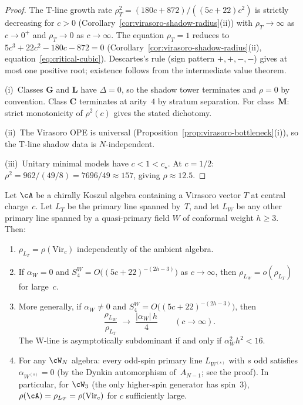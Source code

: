 \begin{proof}
The T-line growth rate $\rho_T^2 = (180c{+}872)/((5c{+}22)c^2)$
is strictly decreasing for $c > 0$
(Corollary~\ref{cor:virasoro-shadow-radius}(ii))
with $\rho_T \to \infty$ as $c \to 0^+$ and
$\rho_T \to 0$ as $c \to \infty$.
The equation $\rho_T = 1$ reduces to
$5c^3 + 22c^2 - 180c - 872 = 0$
(Corollary~\ref{cor:virasoro-shadow-radius}(ii),
equation~\eqref{eq:critical-cubic}).
Descartes's rule (sign pattern $+,+,-,-$) gives
at most one positive root; existence follows from the
intermediate value theorem.

(i)~Classes $\mathbf{G}$ and $\mathbf{L}$ have
$\Delta = 0$, so the shadow tower terminates and $\rho = 0$
by convention.  Class $\mathbf{C}$ terminates at arity~$4$
by stratum separation.  For class~$\mathbf{M}$:
strict monotonicity of $\rho^2(c)$ gives the stated
dichotomy.

(ii)~The Virasoro OPE is universal
(Proposition~\ref{prop:virasoro-bottleneck}(i)),
so the T-line shadow data is $N$-independent.

(iii)~Unitary minimal models have $c < 1 < c_\star$.
At $c = 1/2$: $\rho^2 = 962/(49/8)
= 7696/49 \approx 157$, giving
$\rho \approx 12.5$.
\end{proof}

\begin{proposition}
\label{prop:virasoro-bottleneck}
\ClaimStatusProvedHere
{}
Let $\cA$ be a chirally Koszul algebra containing a
Virasoro vector $T$ at central charge~$c$.
Let $L_T$ be the primary line spanned by~$T$, and
let $L_W$ be any other primary line spanned by a
quasi-primary field $W$ of conformal weight $h \geq 3$.
Then:
\begin{enumerate}[label=\textup{(\roman*)}]
\item $\rho_{L_T} = \rho(\mathrm{Vir}_c)$ independently
  of the ambient algebra.

\item If $\alpha_W = 0$ and
  $S_4^W = O\bigl((5c{+}22)^{-(2h-3)}\bigr)$
  as $c \to \infty$, then
  $\rho_{L_W} = o(\rho_{L_T})$ for large~$c$.

\item More generally, if $\alpha_W \neq 0$ and
  $S_4^W = O\bigl((5c{+}22)^{-(2h-3)}\bigr)$,
  then
  \[
    \frac{\rho_{L_W}}{\rho_{L_T}}
    \;\longrightarrow\;
    \frac{|\alpha_W|\,h}{4}
    \qquad(c \to \infty).
  \]
  The W-line is asymptotically subdominant
  if and only if $\alpha_W^2 h^2 < 16$.

\item For any $\cW_N$ algebra:
  every odd-spin primary line $L_{W^{(s)}}$ with
  $s$ odd satisfies $\alpha_{W^{(s)}} = 0$
  \textup{(}by the Dynkin automorphism of~$A_{N-1}$;
  see the proof\textup{)}.
  In particular, for $\cW_3$ \textup{(}the only
  higher-spin generator has spin~$3$\textup{)},
  $\rho(\cA) = \rho_{L_T} = \rho(\mathrm{Vir}_c)$
  for $c$ sufficiently large.
\end{enumerate}
\end{proposition}

